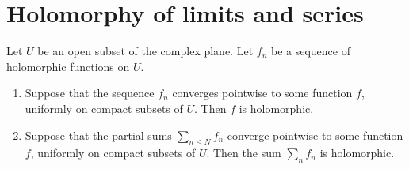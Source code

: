 \documentclass[reqno]{amsart} 
\begin{document}
\section{Holomorphy of limits and series}
\begin{theorem}\label{theorem:cj3vqa91ti}
  Let $U$ be an open subset of the complex plane.  Let $f_n$ be a sequence of holomorphic functions on $U$.
  \begin{enumerate}
  \item Suppose that the sequence $f_n$ converges pointwise to some function $f$, uniformly on compact subsets of $U$.  Then $f$ is holomorphic.
  \item Suppose that the partial sums $\sum_{n \leq N} f_n$ converge pointwise to some function $f$, uniformly on compact subsets of $U$.  Then the sum $\sum_n f_n$ is holomorphic.
  \end{enumerate}
\end{theorem}



{} 
\end{document}
